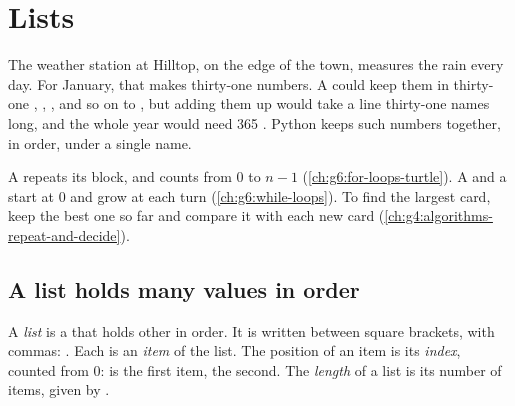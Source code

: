 \chapter{Lists}\label{ch:g7:lists}

The weather station at Hilltop, on the edge of the town, measures the rain
every day. For January, that makes thirty-one numbers. A  could keep
them in thirty-one , , , and so on to
, but adding them up would take a line thirty-one names long, and
the whole year would need 365 . Python keeps such numbers together,
in order, under a single name.

\begin{recall}
A   repeats its block, and  counts from 0 to
$n - 1$ (\cref{ch:g6:for-loops-turtle}). A  and a  start at
0 and grow at each turn (\cref{ch:g6:while-loops}). To find the largest card,
keep the best one so far and compare it with each new card
(\cref{ch:g4:algorithms-repeat-and-decide}).
\end{recall}

\section{A list holds many values in order}

\begin{definition}\label{def:g7:lists:list}
A \emph{list} is a  that holds other  in order. It is
written between square brackets, with commas: \code{[0.0, 0.7, 6.9]}. Each
 is an \emph{item} of the list. The position of an
item is its \emph{index}, counted from 0:  is the first
item,  the second. The \emph{length} of a
list is its number of items, given by .
\end{definition}

